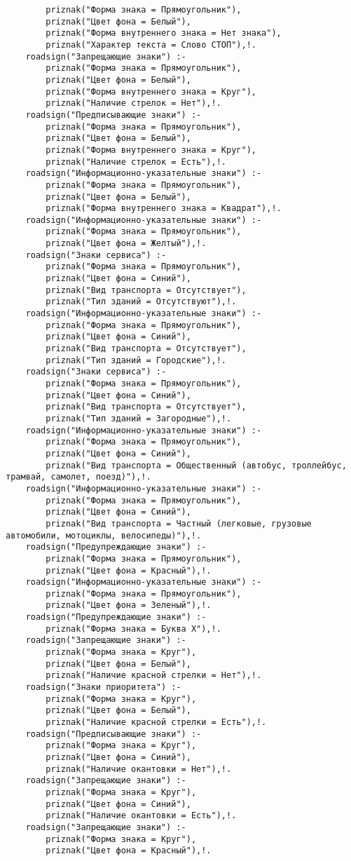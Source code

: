 \begin{verbatim}
		priznak("Форма знака = Прямоугольник"),
		priznak("Цвет фона = Белый"),
		priznak("Форма внутреннего знака = Нет знака"),
		priznak("Характер текста = Слово СТОП"),!.
	roadsign("Запрещающие знаки") :-
		priznak("Форма знака = Прямоугольник"),
		priznak("Цвет фона = Белый"),
		priznak("Форма внутреннего знака = Круг"),
		priznak("Наличие стрелок = Нет"),!.
	roadsign("Предписывающие знаки") :-
		priznak("Форма знака = Прямоугольник"),
		priznak("Цвет фона = Белый"),
		priznak("Форма внутреннего знака = Круг"),
		priznak("Наличие стрелок = Есть"),!.
	roadsign("Информационно-указательные знаки") :-
		priznak("Форма знака = Прямоугольник"),
		priznak("Цвет фона = Белый"),
		priznak("Форма внутреннего знака = Квадрат"),!.
	roadsign("Информационно-указательные знаки") :-
		priznak("Форма знака = Прямоугольник"),
		priznak("Цвет фона = Желтый"),!.
	roadsign("Знаки сервиса") :-
		priznak("Форма знака = Прямоугольник"),
		priznak("Цвет фона = Синий"),
		priznak("Вид транспорта = Отсутствует"),
		priznak("Тип зданий = Отсутствуют"),!.
	roadsign("Информационно-указательные знаки") :-
		priznak("Форма знака = Прямоугольник"),
		priznak("Цвет фона = Синий"),
		priznak("Вид транспорта = Отсутствует"),
		priznak("Тип зданий = Городские"),!.
	roadsign("Знаки сервиса") :-
		priznak("Форма знака = Прямоугольник"),
		priznak("Цвет фона = Синий"),
		priznak("Вид транспорта = Отсутствует"),
		priznak("Тип зданий = Загородные"),!.
	roadsign("Информационно-указательные знаки") :-
		priznak("Форма знака = Прямоугольник"),
		priznak("Цвет фона = Синий"),
		priznak("Вид транспорта = Общественный (автобус, троллейбус, трамвай, самолет, поезд)"),!.
	roadsign("Информационно-указательные знаки") :-
		priznak("Форма знака = Прямоугольник"),
		priznak("Цвет фона = Синий"),
		priznak("Вид транспорта = Частный (легковые, грузовые автомобили, мотоциклы, велосипеды)"),!.
	roadsign("Предупреждающие знаки") :-
		priznak("Форма знака = Прямоугольник"),
		priznak("Цвет фона = Красный"),!.
	roadsign("Информационно-указательные знаки") :-
		priznak("Форма знака = Прямоугольник"),
		priznak("Цвет фона = Зеленый"),!.
	roadsign("Предупреждающие знаки") :-
		priznak("Форма знака = Буква Х"),!.
	roadsign("Запрещающие знаки") :-
		priznak("Форма знака = Круг"),
		priznak("Цвет фона = Белый"),
		priznak("Наличие красной стрелки = Нет"),!.
	roadsign("Знаки приоритета") :-
		priznak("Форма знака = Круг"),
		priznak("Цвет фона = Белый"),
		priznak("Наличие красной стрелки = Есть"),!.
	roadsign("Предписывающие знаки") :-
		priznak("Форма знака = Круг"),
		priznak("Цвет фона = Синий"),
		priznak("Наличие окантовки = Нет"),!.
	roadsign("Запрещающие знаки") :-
		priznak("Форма знака = Круг"),
		priznak("Цвет фона = Синий"),
		priznak("Наличие окантовки = Есть"),!.
	roadsign("Запрещающие знаки") :-
		priznak("Форма знака = Круг"),
		priznak("Цвет фона = Красный"),!.
\end{verbatim}
